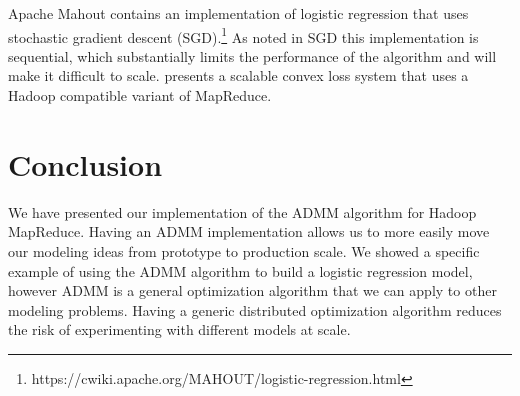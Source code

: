 \documentclass[10pt, conference, compsocconf]{IEEEtran}
\begin{document}
Apache Mahout contains an implementation of logistic regression that uses stochastic gradient descent (SGD).\footnote{https://cwiki.apache.org/MAHOUT/logistic-regression.html}  As noted in \cite{agarwal2011} SGD this implementation is sequential, which substantially limits the performance of the algorithm and will make it difficult to scale.  \cite{agarwal2011} presents a scalable convex loss system that uses a Hadoop compatible variant of MapReduce.

\section{Conclusion}\label{sec:conc}
We have presented our implementation of the ADMM algorithm for Hadoop MapReduce.  Having an ADMM implementation allows us to more easily move our modeling ideas from prototype to production scale.  We showed a specific example of using the ADMM algorithm to build a logistic regression model, however ADMM is a general optimization algorithm that we can apply to other modeling problems.  Having a generic distributed optimization algorithm reduces the risk of experimenting with different models at scale.











%



\end{document}
